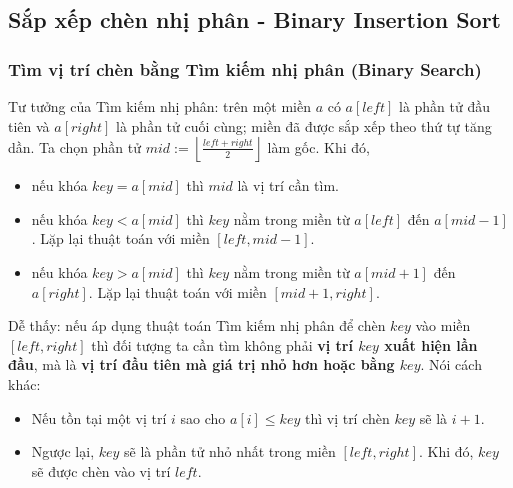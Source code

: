 \documentclass[]{article}
\begin{document}
\subsection{Sắp xếp chèn nhị phân - Binary Insertion Sort}
\label{subsec:bininsertsort}
\subsubsection{Tìm vị trí chèn bằng Tìm kiếm nhị phân (Binary Search)}
Tư tưởng của Tìm kiếm nhị phân: trên một miền $a$ có $a[left]$ là phần tử đầu tiên và $a[right]$ là phần tử cuối cùng; miền đã được sắp xếp theo thứ tự tăng dần. Ta chọn phần tử $\displaystyle mid := \left\lfloor\frac{left + right}{2}\right\rfloor$ làm gốc. Khi đó,
\begin{itemize}
\item nếu khóa $key = a[mid]$ thì $mid$ là vị trí cần tìm.
\item nếu khóa $key < a[mid]$ thì $key$ nằm trong miền từ $a[left]$ đến $a[mid - 1]$. Lặp lại thuật toán với miền $[left, mid - 1]$.
\item nếu khóa $key > a[mid]$ thì $key$ nằm trong miền từ $a[mid + 1]$ đến $a[right]$. Lặp lại thuật toán với miền $[mid + 1, right]$.
\end{itemize}
Dễ thấy: nếu áp dụng thuật toán Tìm kiếm nhị phân để chèn $key$ vào miền $[left, right]$ thì đối tượng ta cần tìm không phải \textbf{vị trí $key$ xuất hiện lần đầu}, mà là \textbf{vị trí đầu tiên mà giá trị nhỏ hơn hoặc bằng $key$}. Nói cách khác:
\begin{itemize}
\item Nếu tồn tại một vị trí $i$ sao cho $a[i] \leq key$ thì vị trí chèn $key$ sẽ là $i + 1$.
\item Ngược lại, $key$ sẽ là phần tử nhỏ nhất trong miền $[left, right]$. Khi đó, $key$ sẽ được chèn vào vị trí $left$.
\end{itemize}
\end{document}

